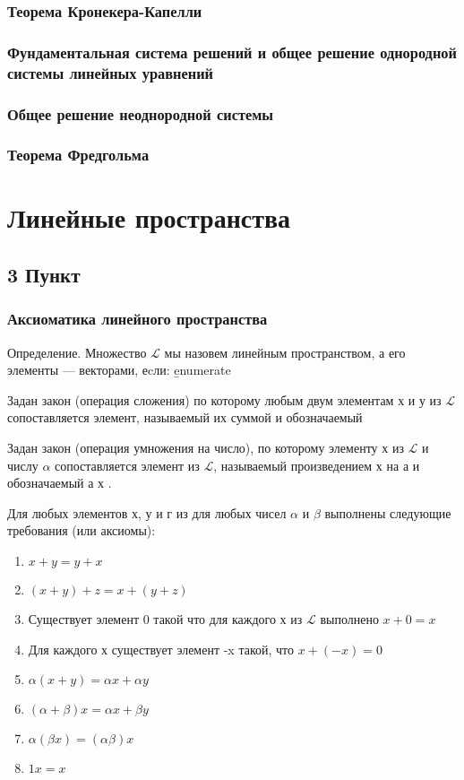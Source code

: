 \documentclass[11pt; a4paper]{report}
\theoremstyle{plain} %
\theoremstyle{defenition}
\theoremstyle{remark}
\begin{document}
\subsection{Теорема Кронекера-Капелли}
\subsection{Фундаментальная система решений и общее решение однородной системы линейных уравнений}
\subsection{Общее решение неоднородной системы}
\subsection{Теорема Фредгольма}


\chapter{Линейные пространства}
\section{\Large 3 Пункт}
\subsection{Аксиоматика линейного пространства}
Определение. Множество $\mathscr{L}$ мы назовем линейным пространством, а его элементы — векторами, еcли:
\b{enumerate}
\item Задан закон (операция сложения) по которому любым двум элементам х и у из  $\mathscr{L}$ сопоставляется элемент, называемый их суммой и обозначаемый 
\item Задан закон (операция умножения на число), по которому элементу х из $\mathscr{L}$ и числу $\alpha$ сопоставляется элемент из $\mathscr{L}$, называемый произведением х на а и обозна­чаемый а х .
\item Для любых элементов х, у и г из для любых чисел $\alpha$ и $\beta$ выполнены следующие требования (или аксиомы):
\begin{enumerate}
\item $x+y = y+x$
\item $(x + y) + z = x + (y + z)$
\item Существует элемент 0 такой что для каждого х из $\mathscr{L}$ выполнено $x + 0=x$
\item Для каждого х существует элемент -x такой, что $x + (-x) = 0$
\item $\alpha(x+y) = \alpha x + \alpha y$
\item $ (\alpha + \beta)x = \alpha x+\beta y$
\item $ \alpha( \beta x) = (\alpha \beta) x$
\item $1x = x$
\end{enumerate}
\end{document}
